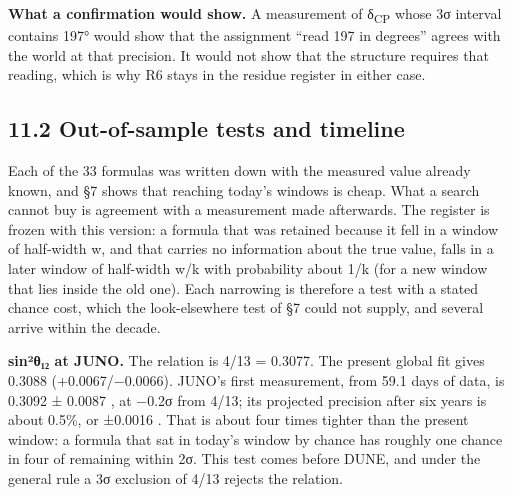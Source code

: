 \documentclass[11pt,a4paper]{article}
\begin{document}
\textbf{What a confirmation would show.} A measurement of δ\textsubscript{CP} whose 3σ interval contains 197° would show that the assignment ``read 197 in degrees'' agrees with the world at that precision. It would not show that the structure requires that reading, which is why R6 stays in the residue register in either case.

\subsection{11.2 Out-of-sample tests and timeline}\label{out-of-sample-tests-and-timeline}

Each of the 33 formulas was written down with the measured value already known, and §7 shows that reaching today's windows is cheap. What a search cannot buy is agreement with a measurement made afterwards. The register is frozen with this version: a formula that was retained because it fell in a window of half-width w, and that carries no information about the true value, falls in a later window of half-width w/k with probability about 1/k (for a new window that lies inside the old one). Each narrowing is therefore a test with a stated chance cost, which the look-elsewhere test of §7 could not supply, and several arrive within the decade.

\textbf{sin²θ₁₂ at JUNO.} The relation is 4/13 = 0.3077. The present global fit gives 0.3088 (+0.0067/−0.0066). JUNO's first measurement, from 59.1 days of data, is 0.3092 ± 0.0087 \cite{58}, at −0.2σ from 4/13; its projected precision after six years is about 0.5\%, or ±0.0016 \cite{59}. That is about four times tighter than the present window: a formula that sat in today's window by chance has roughly one chance in four of remaining within 2σ. This test comes before DUNE, and under the general rule a 3σ exclusion of 4/13 rejects the relation.
\end{document}
